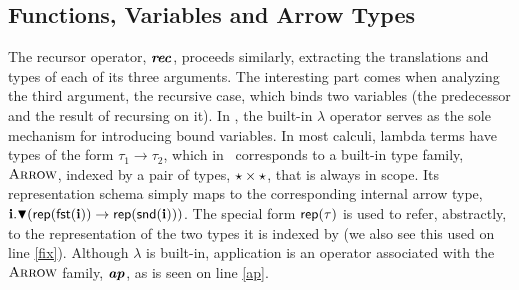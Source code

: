 \documentclass{llncs}
\begin{document}
\subsection{Functions, Variables and Arrow Types}
The recursor operator, $\textbf{\textit{rec}}$, proceeds similarly, extracting the translations and types of each of its three arguments. The interesting part comes when analyzing the third argument, the recursive case, which binds two variables (the predecessor and the result of recursing on it). In \atlam, the built-in $\lambda$ operator serves as the sole mechanism for introducing bound variables. In most calculi, lambda terms have types of the form $\tau_1 \rightarrow \tau_2$, which in \atlam~corresponds to a built-in type family, $\textsc{Arrow}$, indexed by a pair of types, $\star \times \star$, that is always in scope. Its representation schema simply maps to the corresponding internal arrow type, ${\textbf{i}}.\blacktriangledown({\sf rep}({\sf fst}({\textbf{i}}))\rightarrow{\sf rep}({\sf snd}({\textbf{i}})))$. The special form ${\sf rep}(\tau)$ is used to refer, abstractly, to the representation of the two types it is indexed by (we also see this used on line \ref{fix}). Although $\lambda$ is built-in, application is an operator associated with the $\textsc{Arrow}$ family, $\textbf{\textit{ap}}$, as is seen on line \ref{ap}. 
\end{document}
